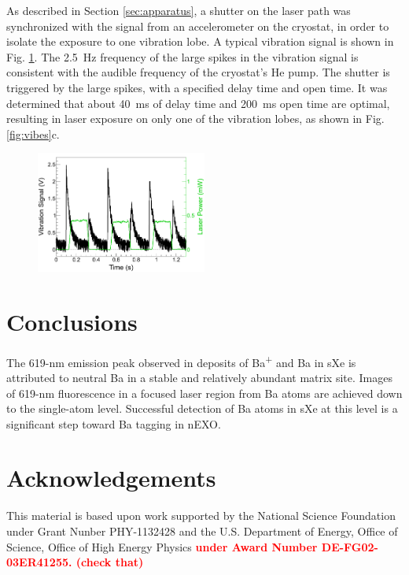 \documentclass[aps,pra,reprint,superscriptaddress]{revtex4-1}
\begin{document}

As described in Section \ref{sec:apparatus}, a shutter on the laser path was synchronized with the signal from an accelerometer on the cryostat, in order to isolate the exposure to one vibration lobe.  A typical vibration signal is shown in Fig. \ref{fig:vibeSig}.  The 2.5~Hz frequency of the large spikes in the vibration signal is consistent with the audible frequency of the cryostat's He pump.  The shutter is triggered by the large spikes, with a specified delay time and open time.  It was determined that about 40~ms of delay time and 200~ms open time are optimal, resulting in laser exposure on only one of the vibration lobes, as shown in Fig. \ref{fig:vibes}c.

\begin{figure}
\includegraphics[width=0.5\textwidth]{figures/vibes_accelerometrSig.png}
\caption{}
\label{fig:vibeSig}
\end{figure}

\section{Conclusions}

The 619-nm emission peak observed in deposits of Ba\textsuperscript{+} and Ba in sXe is attributed to neutral Ba in a stable and relatively abundant matrix site.
Images of 619-nm fluorescence in a focused laser region from Ba atoms are achieved down to the single-atom level.  Successful detection of Ba atoms in sXe at this level is a significant step toward Ba tagging in nEXO. 

\section*{Acknowledgements}

This material is based upon work supported by the National Science Foundation under Grant Nunber PHY-1132428 and the U.S. Department of Energy, Office of Science, Office of High Energy Physics \textbf{\textcolor{red}{under Award Number DE-FG02-03ER41255. (check that)}}
\end{document}
